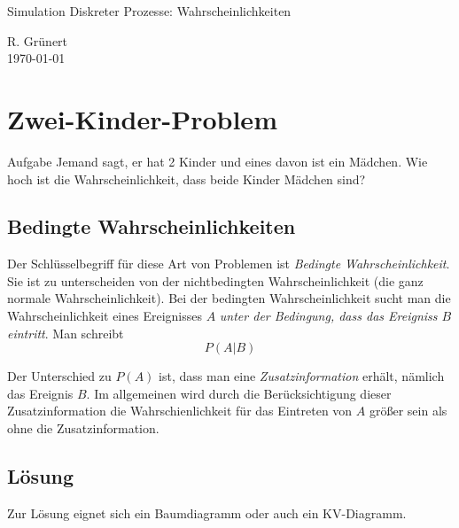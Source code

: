 \documentclass[11pt, a4paper]{article}
\begin{document}
\begin{center}
  \Large{Simulation Diskreter Prozesse: Wahrscheinlichkeiten}
\end{center}

\begin{flushright}
  R. Grünert\\
  \today
\end{flushright}

\section{Zwei-Kinder-Problem}
\begin{zitat}{Aufgabe}
Jemand sagt, er hat 2 Kinder und eines davon ist ein Mädchen. Wie hoch ist die Wahrscheinlichkeit, dass beide Kinder Mädchen sind?
\end{zitat}

\subsection{Bedingte Wahrscheinlichkeiten}

Der Schlüsselbegriff für diese Art von Problemen ist \emph{Bedingte Wahrscheinlichkeit}. Sie ist zu unterscheiden von der nichtbedingten Wahrscheinlichkeit (die ganz normale Wahrscheinlichkeit). Bei der bedingten Wahrscheinlichkeit sucht man die Wahrscheinlichkeit eines Ereignisses $A$ \emph{unter der Bedingung, dass das Ereigniss $B$ eintritt}. Man schreibt
\[P(A | B)\]

Der Unterschied zu $P(A)$ ist, dass man eine \emph{Zusatzinformation} erhält, nämlich das Ereignis $B$. Im allgemeinen wird durch die Berücksichtigung dieser Zusatzinformation die Wahrschienlichkeit für das Eintreten von $A$ größer sein als ohne die Zusatzinformation.

\subsection{Lösung}
Zur Lösung eignet sich ein Baumdiagramm oder auch ein KV-Diagramm.


\begin{figure}[H]
\centering
{}
\end{figure}


\begin{figure}[H]
\centering
{}
\end{figure}
\end{document}
